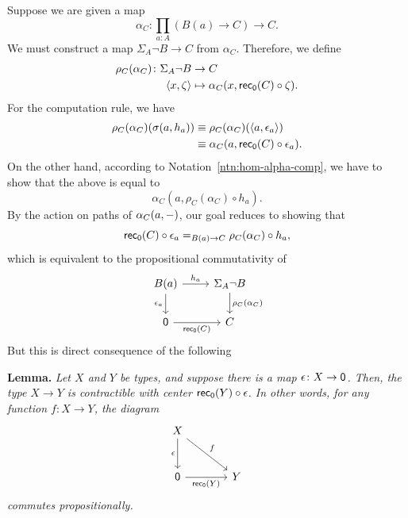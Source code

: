 \begin{solution}
\begin{enumerate}[a)]
        Suppose we are given a map
        \[
            \alpha_C\colon\prod_{a\colon A}(B(a)\to C)\to C.
        \]
        We must construct a map $\Sigma_A\neg B\to C$ from $\alpha_C$. Therefore, we define
        \begin{align*}
            \rho_C(\alpha_C)\colon
                \Sigma_A\neg B&\to C\\
            \dep{x,\zeta}&\mapsto\alpha_C
                (x,\fun{rec}_\fun0(C)\circ\zeta).
        \end{align*}
        For the computation rule, we have
        \begin{align*}
            \rho_C(\alpha_C)(\sigma(a,h_a))
                &\equiv\rho_C(\alpha_C)(\langle a,\epsilon_a\rangle)\\
                &\equiv\alpha_C
                    (
                        a,
                        \mathsf{rec}_{\mathsf{0}}(C)\circ\epsilon_a
                    ).
        \end{align*}
        On the other hand, according to Notation~\ref{ntn:hom-alpha-comp}, we have to show that the above is equal to
        \[
            \alpha_C(a,\rho_C(\alpha_C)\circ h_a).
        \]
        By the action on paths of $\alpha_C(a,{\mathord-})$, our goal reduces to showing that
        \[
            \mathsf{rec}_{\mathsf{0}}(C)\circ\epsilon_a
            \mathrel{=_{B(a)\to C}}
            \rho_C(\alpha_C)\circ h_a,
        \]
        which is equivalent to the propositional commutativity of
        \[
            \begin{tikzcd}
                B(a)
                        \arrow[r,"h_a"]
                        \arrow[d,"\epsilon_a"']
                    &\Sigma_A\neg B
                        \arrow[d,"\rho_C(\alpha_C)"]\\
                \fun0
                        \arrow[r,"\fun{rec}_{\fun0}(C)"']
                    &C
            \end{tikzcd}
        \]
        But this is direct consequence of the following

        \medskip

        \textbf{Lemma.} {\itshape
            Let\/ $X$ and\/ $Y$ be types, and suppose there is a map\/ $\epsilon\colon X\to\fun0$. Then, the type\/ $X\to Y$ is contractible with center\/ $\mathsf{rec}_{\mathsf{0}}(Y)\circ\epsilon$. In other words, for any function\/ $f\colon X\to Y$, the diagram
            \[
                \begin{tikzcd}[row sep=large,column sep=large]
                    X
                            \arrow[d,"\epsilon"']
                            \arrow[dr,"f"]\\
                    \fun0
                            \arrow[r,"\fun{rec}_{\fun0}(Y)"']
                        &Y
                \end{tikzcd}
            \]
            commutes propositionally.}
        

\end{enumerate}
\end{solution}
